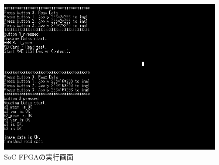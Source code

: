 \documentclass[paper]{ieicej}
\begin{document}
\begin{figure}
  \begin{center}
    \includegraphics[width=0.98\columnwidth]{figures/Ex_re7.png}
  \end{center}
  \caption{SoC FPGAの実行画面}
  \label{fig:3-1}
\end{figure}
\end{document}
